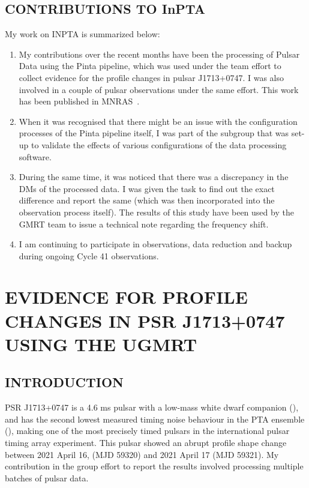 \documentclass{article}
\begin{document}
\subsection{CONTRIBUTIONS TO InPTA}
My work on  INPTA  is summarized below:
\begin{enumerate}
\item My contributions over the recent months have been the processing of Pulsar Data using the Pinta pipeline, which was used under the team effort to collect evidence for the profile changes in pulsar J1713+0747. I was also involved in a couple of pulsar observations under the same effort. This work has been published in MNRAS~\cite{10.1093/mnrasl/slab098}.

\item When it was recognised that there might be an issue with the configuration processes of the Pinta pipeline itself, I was part of the subgroup that was set-up to validate the effects of various configurations of the data processing software. 

\item During the same time, it was noticed that there was a discrepancy in the DMs of the processed data. I was given the task to find out the exact difference and report the same (which was then incorporated into the observation process itself). The results of this study have been used by the GMRT team to issue a technical note regarding the frequency shift.

\item I am continuing  to participate in observations, data reduction and backup during ongoing Cycle 41 observations. 
\end{enumerate}
\clearpage
\newpage
\section{EVIDENCE FOR PROFILE CHANGES IN PSR J1713+0747 USING THE UGMRT}
\label{sec:headings}
 \subsection{INTRODUCTION}
PSR J1713+0747 is a 4.6 ms pulsar with a low-mass white dwarf companion (\cite{FosterWC+1993}), and has the second lowest measured timing noise behaviour in the PTA ensemble (\cite{pdd+19}), making one of the most precisely timed pulsars in the international pulsar timing array experiment. This pulsar showed an abrupt profile shape change between 2021 April 16, (MJD 59320) and 2021 April 17 (MJD 59321). My contribution in the group effort to report the results involved processing multiple batches of pulsar data. 
\end{document}
